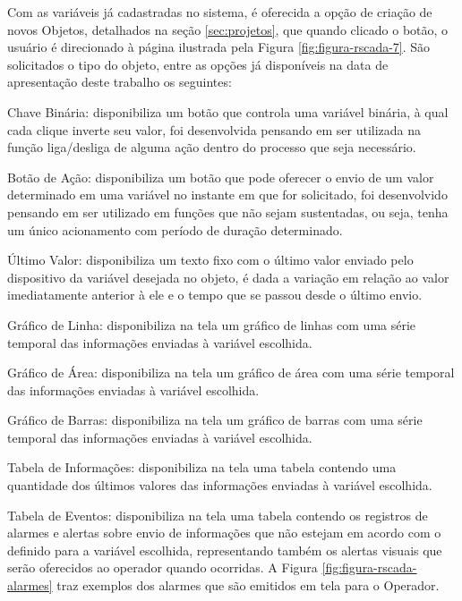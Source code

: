         \begin{figure}[!h]
    	\end{figure}

Com as variáveis já cadastradas no sistema, é oferecida a opção de criação de novos Objetos, detalhados na seção \ref{sec:projetos}, que quando clicado o botão, o usuário é direcionado à página ilustrada pela Figura \ref{fig:figura-rscada-7}. São solicitados o tipo do objeto, entre as opções já disponíveis na data de apresentação deste trabalho os seguintes:

\begin{alineascomponto}
    \item Chave Binária: disponibiliza um botão que controla uma variável binária, à qual cada clique inverte seu valor, foi desenvolvida pensando em ser utilizada na função liga/desliga de alguma ação dentro do processo que seja necessário.
    \item Botão de Ação: disponibiliza um botão que pode oferecer o envio de um valor determinado em uma variável no instante em que for solicitado, foi desenvolvido pensando em ser utilizado em funções que não sejam sustentadas, ou seja, tenha um único acionamento com período de duração determinado.
    \item Último Valor: disponibiliza um texto fixo com o último valor enviado pelo dispositivo da variável desejada no objeto, é dada a variação em relação ao valor imediatamente anterior à ele e o tempo que se passou desde o último envio.
    \item Gráfico de Linha: disponibiliza na tela um gráfico de linhas com uma série temporal das informações enviadas à variável escolhida. 
    \item Gráfico de Área: disponibiliza na tela um gráfico de área com uma série temporal das informações enviadas à variável escolhida.
    \item Gráfico de Barras: disponibiliza na tela um gráfico de barras com uma série temporal das informações enviadas à variável escolhida.
    \item Tabela de Informações: disponibiliza na tela uma tabela contendo uma quantidade dos últimos valores das informações enviadas à variável escolhida.
    \item Tabela de Eventos:  disponibiliza na tela uma tabela contendo os registros de alarmes e alertas sobre envio de informações que não estejam em acordo com o definido para a variável escolhida, representando também os alertas visuais que serão oferecidos ao operador quando ocorridas. A Figura \ref{fig:figura-rscada-alarmes} traz exemplos dos alarmes que são emitidos em tela para o Operador.
\end{alineascomponto}

